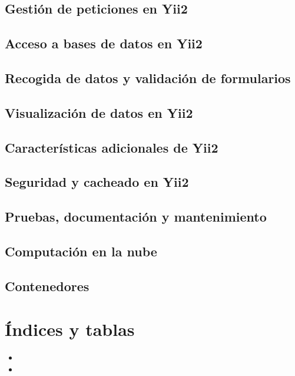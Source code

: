 \documentclass[a4paper,11pt,spanish]{sphinxmanual}
\begin{document}
\chapter{Gestión de peticiones en Yii2}
\label{\detokenize{yii2:gestion-de-peticiones-en-yii2}}

\chapter{Acceso a bases de datos en Yii2}
\label{\detokenize{yii2:acceso-a-bases-de-datos-en-yii2}}

\chapter{Recogida de datos y validación de formularios}
\label{\detokenize{yii2:recogida-de-datos-y-validacion-de-formularios}}

\chapter{Visualización de datos en Yii2}
\label{\detokenize{yii2:visualizacion-de-datos-en-yii2}}

\chapter{Características adicionales de Yii2}
\label{\detokenize{yii2:caracteristicas-adicionales-de-yii2}}

\chapter{Seguridad y cacheado en Yii2}
\label{\detokenize{yii2:seguridad-y-cacheado-en-yii2}}

\chapter{Pruebas, documentación y mantenimiento}
\label{\detokenize{yii2:pruebas-documentacion-y-mantenimiento}}

\chapter{Computación en la nube}
\label{\detokenize{yii2:computacion-en-la-nube}}

\chapter{Contenedores}
\label{\detokenize{yii2:contenedores}}

\part{Índices y tablas}
\label{\detokenize{index_latex:indices-y-tablas}}\begin{itemize}
\item {} 

\item {} 

\end{itemize}



\renewcommand{\indexname}{Índice}
\printindex
\end{document}
